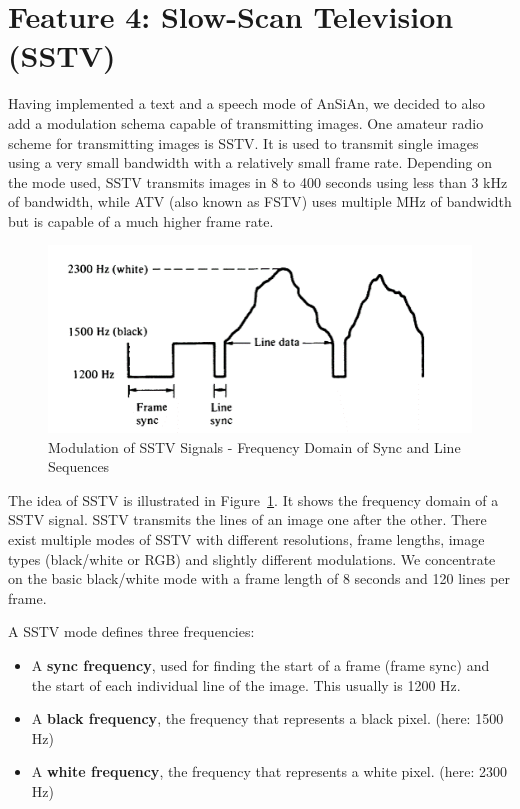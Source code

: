 \section{Feature 4: Slow-Scan Television (SSTV)}
\label{sec:impl:sstv}
Having implemented a text and a speech mode of AnSiAn, we decided to also add a modulation schema capable of transmitting images. One amateur radio scheme for transmitting images is \ac{SSTV}. It is used to transmit single images using a very small bandwidth with a relatively small frame rate. Depending on the mode used, SSTV transmits images in 8 to 400 seconds using less than 3 kHz of bandwidth, while \ac{ATV} (also known as \ac{FSTV}) uses multiple MHz of bandwidth but is capable of a much higher frame rate. 
\begin{figure}
	\centering
	\includegraphics[width=\linewidth]{gfx/sstv_intro.png}
	\caption{Modulation of \ac{SSTV}  Signals - Frequency Domain of Sync and Line Sequences \cite[p. 239]{pritchard2016newnes}}
	\label{fig:impl:sstv:intro}
\end{figure}

The idea of \ac{SSTV} is illustrated in Figure~\ref{fig:impl:sstv:intro}. It shows the frequency domain of a SSTV signal. SSTV transmits the lines of an image one after the other. There exist multiple modes of SSTV with different resolutions, frame lengths, image types (black/white or RGB) and slightly different modulations. We concentrate on the basic black/white mode with a frame length of 8 seconds and 120 lines per frame.  

A SSTV mode defines three frequencies: 

\begin{itemize}
	\item A \textbf{sync frequency}, used for finding the start of a frame (frame sync) and the start of each individual line of the image. This usually is 1200 Hz. 
	\item A \textbf{black frequency}, the frequency that represents a black pixel. (here: 1500 Hz)
	\item A \textbf{white frequency}, the frequency that represents a white pixel. (here: 2300 Hz)
\end{itemize}

